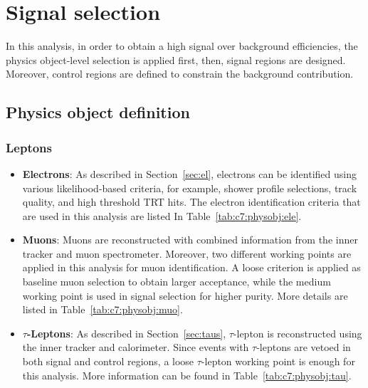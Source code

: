 \chapter{Signal selection}
\label{ch:ana-sig}

\par In this analysis, in order to obtain a high signal over background efficiencies, the physics object-level selection is applied first, then, signal regions are designed. 
Moreover, control regions are defined to constrain the background contribution.

\section{Physics object definition}
\label{sec:ana-sig:physobj}

\subsection{Leptons}

\begin{itemize}
    \item \textbf{Electrons}: As described in Section~\ref{sec:el}, electrons can be identified using various likelihood-based criteria, for example, shower profile selections, track quality, and high threshold TRT hits. The electron identification criteria that are used in this analysis are listed In Table~\ref{tab:c7:physobj:ele}.
    \item \textbf{Muons}: Muons are reconstructed with combined information from the inner tracker and muon spectrometer. Moreover, two different working points are applied in this analysis for muon identification. A loose criterion is applied as baseline muon selection to obtain larger acceptance, while the medium working point is used in signal selection for higher purity. More details are listed in Table~\ref{tab:c7:physobj:muo}.
    \item \textbf{$\tau$-Leptons}: As described in Section~\ref{sec:taus}, $\tau$-lepton is reconstructed using the inner tracker and calorimeter. Since events with $\tau$-leptons are vetoed in both signal and control regions, a loose $\tau$-lepton working point is enough for this analysis. More information can be found in Table~\ref{tab:c7:physobj:tau}.
\end{itemize}

